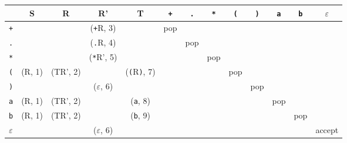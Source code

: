 \begin{solution}
\begin{enumerate}[(a)]
    \begin{center}
    \begin{tabular}{c | c c c c | cccccccc}
                   & S     & R       & R'                & T                         & \texttt{+} & \texttt{.} & \texttt{*} & \texttt{(} & \texttt{)} & \texttt{a} & \texttt{b} & $\varepsilon$ \\
      \hline
      \texttt{+}   &       &         &(\texttt{+}R, 3)   &                           & pop &     &     &     &     &     &     &        \\
      \texttt{.}   &       &         &(\texttt{.}R, 4)   &                           &     & pop &     &     &     &     &     &        \\
      \texttt{*}   &       &         &(\texttt{*}R', 5)  &                           &     &     & pop &     &     &     &     &        \\
      \texttt{(}   &(R, 1) &(TR', 2) &                   &(\texttt{(}R\texttt{)}, 7) &     &     &     & pop &     &     &     &        \\
      \texttt{)}   &      &         &($\varepsilon$, 6)  &                           &     &     &     &     & pop &     &     &        \\
      \texttt{a}   &(R, 1) &(TR', 2) &                   &(\texttt{a}, 8)            &     &     &     &     &     & pop &     &        \\
      \texttt{b}   &(R, 1) &(TR', 2) &                   &(\texttt{b}, 9)            &     &     &     &     &     &     & pop &        \\
      $\varepsilon$&       &         &($\varepsilon$, 6) &                           &     &     &     &     &     &     &     & accept \\
    \end{tabular}
    \end{center}


\end{enumerate}
\end{solution}
